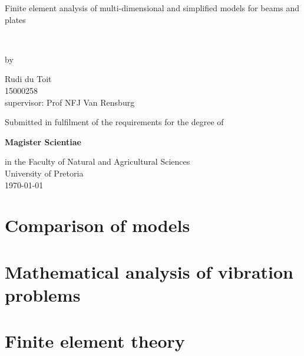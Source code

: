 \documentclass[12pt]{report}
\begin{document}
\begin{titlepage}
  \centering
  \vspace*{0.3in}
  {\Huge Finite element analysis of multi-dimensional and simplified models for beams and plates\par}
  \vspace{0.5in}\
  {\Large by\par}
  {\Large Rudi du Toit\\[0.1in]}
  {\Large 15000258 \\[0.1in]}
  {supervisor: Prof NFJ Van Rensburg \\[0.75in]}

  {Submitted in fulfilment of the requirements for the degree of\\[0.1in]}
  
  {\bfseries Magister Scientiae\\[0.1in]}
  
  {in the Faculty of Natural and Agricultural Sciences\\[0.1in]}
  {University of Pretoria\\[0.75in]}
  \today
\end{titlepage}





\tableofcontents

\chapter{Comparison of models}\label{ch:comparison-of-models}







\chapter{Mathematical analysis of vibration problems}\label{ch:mathematical-analysis-of-vibration-problems}


\chapter{Finite element theory}\label{ch:finite-element-theory}


\end{document}
